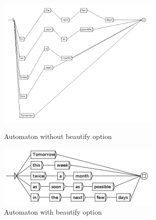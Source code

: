 \begin{figure}[!ht]
	\begin{minipage}[h!]{0.5\linewidth}
		\centering
		\includegraphics[width=8cm]{resources/img/fig8-5GRFnoBeautify.png}	
		\caption{Automaton without beautify option\label{fig8-5GRFnoBeautify}}
	\end{minipage}
	\hspace{0.1cm}
	\begin{minipage}[h!]{0.5\linewidth}
		\centering
		\includegraphics[width=8cm]{resources/img/fig8-6GRFBeautify.png}
		\caption{Automaton with beautify option\label{fig8-6GRFBeautify}}
	\end{minipage}
	\hspace{0.1cm}
\end{figure}
\pagebreak
